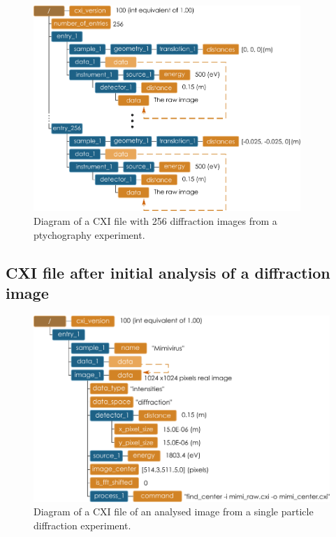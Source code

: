 \documentclass[usletter,11pt]{article}
\begin{document}
\begin{figure}[h!]
\centering
\includegraphics[width=0.9\textwidth]{ptychography_cxi.pdf}
\caption{Diagram of a CXI file with 256 diffraction images from a ptychography experiment.}
\label{fig:ptychography_cxi}
\end{figure}


\clearpage
\subsection{CXI file after initial analysis of a diffraction image}

\begin{figure}[h!]
\centering
\includegraphics[width=\textwidth]{analysed_image.pdf}
\caption{Diagram of a CXI file of an analysed image from a single
particle diffraction experiment.}
\label{fig:analysed_image}
\end{figure}
\end{document}
